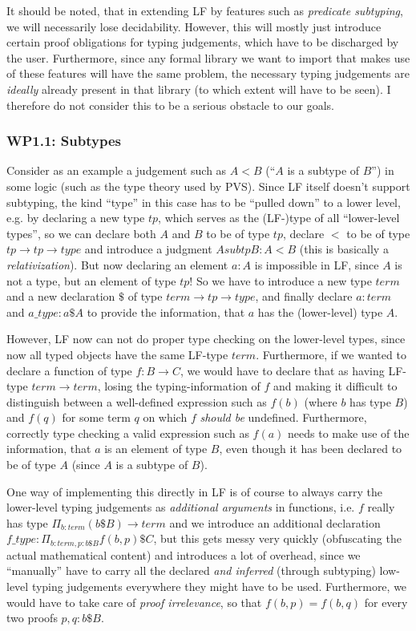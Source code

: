 It should be noted, that in extending LF by features such as \emph{predicate subtyping}, we will necessarily lose decidability. However, this will mostly just introduce certain proof obligations for typing judgements, which have to be discharged by the user. Furthermore, since any formal library we want to import that makes use of these features will have the same problem, the necessary typing judgements are \emph{ideally} already present in that library (to which extent will have to be seen). I therefore do not consider this to be a serious obstacle to our goals.

\subsubsection{\textbf{WP1.1}: Subtypes}
Consider as an example a judgement such as $A<B$ (``$A$ is a subtype of $B$'') in some logic (such as the type theory used by PVS). Since LF itself doesn't support subtyping, the kind ``type'' in this case has to be ``pulled down'' to a lower level, e.g. by declaring a new type $tp$, which serves as the (LF-)type of all ``lower-level types'', so we can declare both $A$ and $B$ to be of type $tp$, declare $<$ to be of type $tp\to tp\to type$ and introduce a judgment $AsubtpB: A < B$ (this is basically a \emph{relativization}). But now declaring an element $a:A$ is impossible in LF, since $A$ is not a type, but an element of type $tp$! So we have to introduce a new type $term$ and a new declaration $\$$ of type $term\to tp\to type$, and finally declare $a:term$ and
$a\_type: a\$A$ to provide the information, that $a$ has the (lower-level) type $A$.

However, LF now can not do proper type checking on the lower-level types, since now all typed objects have the same LF-type $term$. Furthermore, if we wanted to declare a function of type $f:B\to C$, we would have to declare that as having LF-type $term\to term$, losing the typing-information of $f$ and making it difficult to distinguish between a well-defined expression such as $f(b)$ (where $b$ has type $B$) and $f(q)$ for some term $q$ on which $f$ \emph{should be} undefined.
Furthermore, correctly type checking a valid expression such as $f(a)$ needs to make use of the information, that $a$ is an element of type $B$, even though it has been declared to be of type $A$ (since $A$ is a subtype of $B$).

One way of implementing this directly in LF is of course to always carry the lower-level typing judgements as \emph{additional arguments} in functions, i.e. $f$ really has type $\Pi_{b:term}(b\$B)\to term$ and we introduce an additional declaration $f\_type:\Pi_{b:term,p:b\$B}f(b,p)\$C$, but this gets messy very quickly (obfuscating the actual mathematical content) and introduces a lot of overhead, since we ``ma\-nu\-al\-ly'' have to carry all the declared \emph{and inferred} (through subtyping) low-level typing judgements everywhere they might have to be used. Furthermore, we would have to take care of \emph{proof irrelevance}, so that $f(b,p)=f(b,q)$ for every two proofs $p,q:b\$B$.

